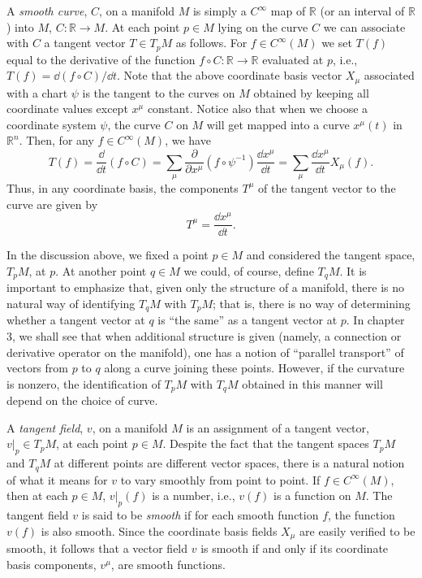 A \emph{smooth curve}, \(C\), on a manifold \(M\) is simply a \(C^\infty\) map
of \(\mathbb{R}\) (or an interval of \(\mathbb{R}\)) into \(M\),
\(C:\mathbb{R}\to M\).  At each point \(p\in M\) lying on the curve \(C\) we can
associate with \(C\) a tangent vector \(T\in T_pM\) as follows.  For
\(f\in C^\infty(M)\) we set \(T(f)\) equal to the derivative of the function
\(f\circ C:\mathbb{R}\to\mathbb{R}\) evaluated at \(p\), i.e.,
\(T(f)=\dd(f\circ C)/\dd t\).  Note that the above coordinate basis vector \(X_\mu\)
associated with a chart \(\psi\) is the tangent to the curves on \(M\) obtained by
keeping all coordinate values except \(x^\mu\) constant.  Notice also that when we
choose a coordinate system \(\psi\), the curve \(C\) on \(M\) will get mapped into
a curve \(x^\mu(t)\) in \(\mathbb{R}^n\).  Then, for any \(f\in C^\infty(M)\), we
have
\begin{equation}
  T(f)=\frac{\dd}{\dd t}(f\circ C)=
  \sum_\mu\frac{\partial}{\partial x^\mu}(f\circ\psi^{-1})\frac{\dd x^\mu}{\dd t}
  =\sum_\mu\frac{\dd x^\mu}{\dd t}X_\mu(f) .
  \tag{2.2.11}\label{eq:2.2.11}
\end{equation}
Thus, in any coordinate basis, the components \(T^\mu\) of the tangent vector to
the curve are given by
\begin{equation}
  T^\mu=\frac{\dd x^\mu}{\dd t} .
  \tag{2.2.12}\label{eq:2.2.12}
\end{equation}

In the discussion above, we fixed a point \(p\in M\) and considered the tangent
space, \(T_pM\), at \(p\).  At another point \(q\in M\) we could, of course,
define \(T_qM\).  It is important to emphasize that, given only the structure of a
manifold, there is no natural way of identifying \(T_qM\) with \(T_pM\); that is,
there is no way of determining whether a tangent vector at \(q\) is ``the same'' as
a tangent vector at \(p\).  In chapter 3, we shall see that when additional
structure is given (namely, a connection or derivative operator on the manifold),
one has a notion of ``parallel transport'' of vectors from \(p\) to \(q\) along a
curve joining these points.  However, if the curvature is nonzero, the identification
of \(T_pM\) with \(T_qM\) obtained in this manner will depend on the choice of
curve.

A \emph{tangent field}, \(v\), on a manifold \(M\) is an assignment of a tangent
vector, \(v|_p\in T_pM\), at each point \(p\in M\).  Despite the fact that the
tangent spaces \(T_pM\) and \(T_qM\) at different points are different vector
spaces, there is a natural notion of what it means for \(v\) to vary smoothly from
point to point.  If \(f\in C^\infty(M)\), then at each \(p\in M\), \(v|_p(f)\) is a
number, i.e., \(v(f)\) is a function on \(M\).  The tangent field \(v\) is said to
be \emph{smooth} if for each smooth function \(f\), the function \(v(f)\) is also
smooth.  Since the coordinate basis fields \(X_\mu\) are easily verified to be
smooth, it follows that a vector field \(v\) is smooth if and only if its coordinate
basis components, \(v^\mu\), are smooth functions.

